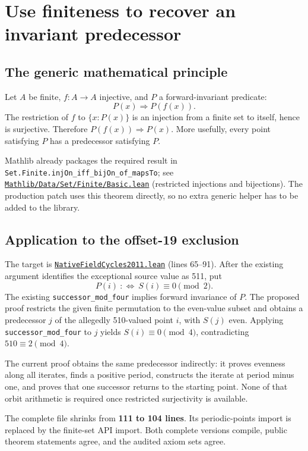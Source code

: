 \documentclass[11pt,letterpaper]{article}
\newcommand{\code}[1]{\nolinkurl{#1}}
\newcommand{\src}[2]{\href{https://github.com/VladimirReshetnikov/ProveIt/blob/e73fa2e916c9bb6f61c79e4fe2cd02b5f43e9d11/Computability/DiophantineConsistency/Lean/DiophantineConsistency/#1.lean}{\nolinkurl{#1.lean}} (lines #2)}
\newcommand{\mathsrc}[2]{\href{https://github.com/leanprover-community/mathlib4/blob/81a5d257c8e410db227a6665ed08f64fea08e997/Mathlib/#1.lean}{\nolinkurl{Mathlib/#1.lean}} (#2)}
\begin{document}
\section{Use finiteness to recover an invariant predecessor}

\subsection{The generic mathematical principle}

Let \(A\) be finite, \(f:A\to A\) injective, and \(P\) a forward-invariant predicate:
\[
 P(x)\Longrightarrow P(f(x)).
\]
The restriction of \(f\) to \(\{x:P(x)\}\) is an injection from a finite set to itself, hence is surjective. Therefore \(P(f(x))\Rightarrow P(x)\). More usefully, every point satisfying \(P\) has a predecessor satisfying \(P\).

Mathlib already packages the required result in
\code{Set.Finite.injOn_iff_bijOn_of_mapsTo}; see
\mathsrc{Data/Set/Finite/Basic}{restricted injections and bijections}. The production patch uses this theorem directly, so no extra generic helper has to be added to the library.

\subsection{Application to the offset-19 exclusion}

The target is \src{NativeFieldCycles2011}{65--91}. After the existing argument identifies the exceptional source value as 511, put
\[
 P(i)\ :\!\iff\ S(i)\equiv0\pmod2.
\]
The existing \code{successor_mod_four} implies forward invariance of \(P\). The proposed proof restricts the given finite permutation to the even-value subset and obtains a predecessor \(j\) of the allegedly 510-valued point \(i\), with \(S(j)\) even. Applying \code{successor_mod_four} to \(j\) yields \(S(i)\equiv0\pmod4\), contradicting \(510\equiv2\pmod4\).

The current proof obtains the same predecessor indirectly: it proves evenness along all iterates, finds a positive period, constructs the iterate at period minus one, and proves that one successor returns to the starting point. None of that orbit arithmetic is required once restricted surjectivity is available.

The complete file shrinks from \textbf{111 to 104 lines}. Its periodic-points import is replaced by the finite-set API import. Both complete versions compile, public theorem statements agree, and the audited axiom sets agree.
\end{document}
